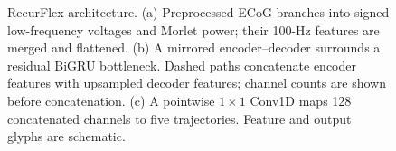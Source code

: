 \begin{figure}[t]
\centering
\resizebox{\textwidth}{!}{%
%
}
\caption{RecurFlex architecture. (a) Preprocessed ECoG branches into signed low-frequency voltages and Morlet power; their 100-Hz features are merged and flattened. (b) A mirrored encoder--decoder surrounds a residual BiGRU bottleneck. Dashed paths concatenate encoder features with upsampled decoder features; channel counts are shown before concatenation. (c) A pointwise $1\times1$ Conv1D maps 128 concatenated channels to five trajectories. Feature and output glyphs are schematic.}
\label{fig:model}
\end{figure}
